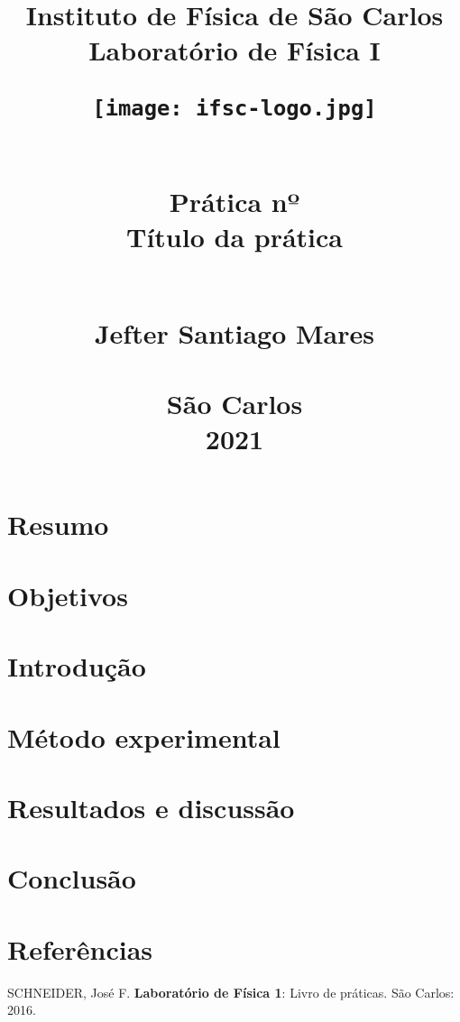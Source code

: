 \documentclass[a4paper, 12pt]{article}
\title{
   \begin{center}
        \Huge{
        \textbf{Instituto de Física de São Carlos \\
        Laboratório de Física I}
        \vspace{1em}
        \begin{figure}[h]
  \begin{center}
      \texttt{[image: ifsc-logo.jpg]}
   \end{center}
\end{figure}
       \vspace{0.5em} \\
        \Large{Prática nº}
        \vspace{0.5em} \\
       \large{ Título da prática}
        }
        \vspace*{\fill}
        \large{
        \\
        Jefter Santiago Mares \\
        }
        \vspace*{\fill}
      \\São Carlos \\  2021
\newpage
\end{center}}
\date{}
\begin{document}
\maketitle
\section{Resumo}
\section{Objetivos}
\section{Introdução}
\section{Método experimental}
\section{Resultados e discussão}
\section{Conclusão}
\section{Referências}
SCHNEIDER, José F. \textbf{Laboratório de Física 1}: Livro de práticas. São Carlos: 2016.
\end{document}
